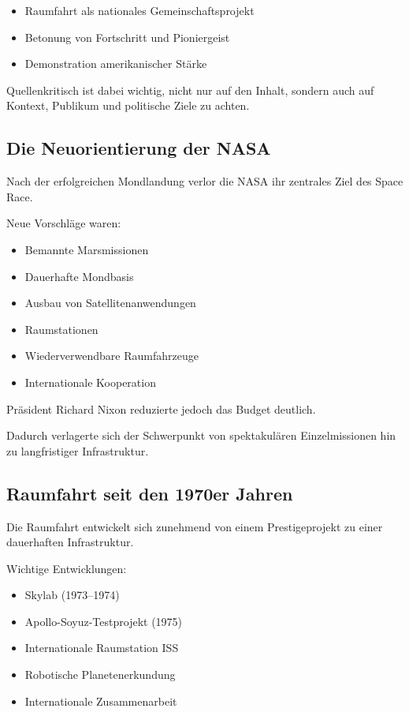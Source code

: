 \begin{itemize}
    \item Raumfahrt als nationales Gemeinschaftsprojekt
    \item Betonung von Fortschritt und Pioniergeist
    \item Demonstration amerikanischer Stärke
\end{itemize}

Quellenkritisch ist dabei wichtig,
nicht nur auf den Inhalt,
sondern auch auf Kontext, Publikum und politische Ziele zu achten.

\subsection{Die Neuorientierung der NASA}

Nach der erfolgreichen Mondlandung verlor die NASA
ihr zentrales Ziel des Space Race.

Neue Vorschläge waren:

\begin{itemize}
    \item Bemannte Marsmissionen
    \item Dauerhafte Mondbasis
    \item Ausbau von Satellitenanwendungen
    \item Raumstationen
    \item Wiederverwendbare Raumfahrzeuge
    \item Internationale Kooperation
\end{itemize}

Präsident Richard Nixon reduzierte jedoch das Budget deutlich.

Dadurch verlagerte sich der Schwerpunkt
von spektakulären Einzelmissionen
hin zu langfristiger Infrastruktur.

\subsection{Raumfahrt seit den 1970er Jahren}

Die Raumfahrt entwickelt sich zunehmend
von einem Prestigeprojekt zu einer dauerhaften Infrastruktur.

Wichtige Entwicklungen:

\begin{itemize}
    \item Skylab (1973–1974)
    \item Apollo-Soyuz-Testprojekt (1975)
    \item Internationale Raumstation ISS
    \item Robotische Planetenerkundung
    \item Internationale Zusammenarbeit
\end{itemize}

